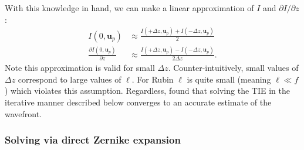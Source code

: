\documentclass[TS,authoryear,toc]{lsstdoc}
\begin{document}
With this knowledge in hand, we can make a linear approximation of $I$ and $\partial I / \partial z$:
\begin{align}
    I(0, \mathbf{u}_p) &\approx \frac{I(+\Delta z, \mathbf{u}_p) + I(-\Delta z, \mathbf{u}_p)}{2} \\[5pt]
    \frac{\partial I(0, \mathbf{u}_p)}{\partial z} &\approx \frac{I(+\Delta z, \mathbf{u}_p) - I(-\Delta z, \mathbf{u}_p)}{2\Delta z}.
\end{align}
Note this approximation is valid for small $\Delta z$.
Counter-intuitively, small values of $\Delta z$ correspond to large values of $\ell$.
For Rubin $\ell$ is quite small (meaning $\ell \ll f$) which violates this assumption.
Regardless, \citet{1993JOSAA..10.2277R} found that solving the TIE in the iterative manner described below converges to an accurate estimate of the wavefront.


\subsubsection{Solving via direct Zernike expansion}
\label{sec:exp}
\end{document}
